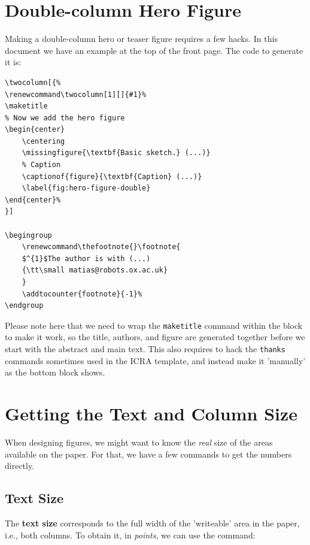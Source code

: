 \documentclass[letterpaper, 10 pt, conference]{ieeeconf}  %
\begin{document}
\section{Double-column Hero Figure}
Making a double-column hero or teaser figure requires a few hacks. In this document we have an example at the top of the front page. The code to generate it is:

\begin{footnotesize}
\begin{verbatim}
\twocolumn[{%
\renewcommand\twocolumn[1][]{#1}%
\maketitle
% Now we add the hero figure
\begin{center}
    \centering
    \missingfigure{\textbf{Basic sketch.} (...)}
    % Caption
    \captionof{figure}{\textbf{Caption} (...)}
    \label{fig:hero-figure-double}
\end{center}%
}]

\begingroup
    \renewcommand\thefootnote{}\footnote{
    $^{1}$The author is with (...)
    {\tt\small matias@robots.ox.ac.uk}
    }
    \addtocounter{footnote}{-1}%
\endgroup
\end{verbatim}
\end{footnotesize}

Please note here that we need to wrap the \texttt{maketitle} command within the block to make it work, so the title, authors, and figure are generated together before we start with the abstract and main text. This also requires to hack the \texttt{thanks} commands sometimes used in the ICRA template, and instead make it 'manually' as the bottom block shows.

\section{Getting the Text and Column Size}
When designing figures, we might want to know the \emph{real} size of the areas available on the paper. For that, we have a few commands to get the numbers directly.

\subsection{Text Size}
The \textbf{text size} corresponds to the full width of the 'writeable' area in the paper, i.e., both columns. To obtain it, in \emph{points}, we can use the command:
\end{document}
